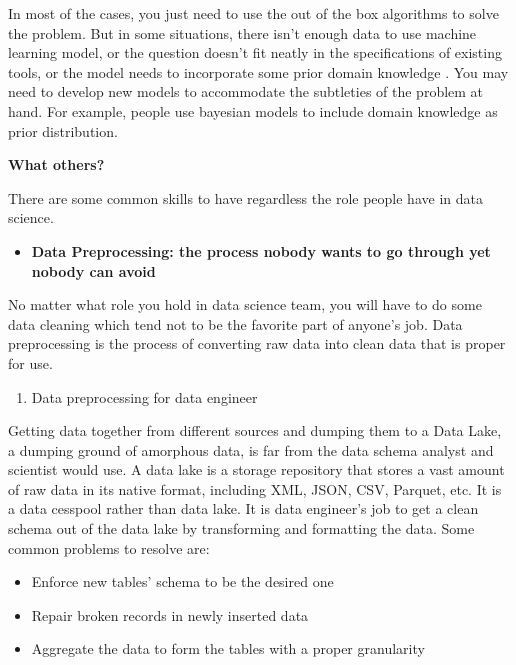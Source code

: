 \documentclass[12pt,]{krantz}
\providecommand{\tightlist}{%
  \setlength{\itemsep}{0pt}\setlength{\parskip}{0pt}}
\begin{document}
In most of the cases, you just need to use the out of the box algorithms to solve the problem. But in some situations, there isn't enough data to use machine learning model, or the question doesn't fit neatly in the specifications of existing tools, or the model needs to incorporate some prior domain knowledge . You may need to develop new models to accommodate the subtleties of the problem at hand. For example, people use bayesian models to include domain knowledge as prior distribution.

\textbf{What others?}

There are some common skills to have regardless the role people have in data science.

\begin{itemize}
\tightlist
\item
  \textbf{Data Preprocessing: the process nobody wants to go through yet nobody can avoid}
\end{itemize}

No matter what role you hold in data science team, you will have to do some data cleaning which tend not to be the favorite part of anyone's job. Data preprocessing is the process of converting raw data into clean data that is proper for use.

\begin{enumerate}
\def\labelenumi{(\arabic{enumi})}
\tightlist
\item
  Data preprocessing for data engineer
\end{enumerate}

Getting data together from different sources and dumping them to a Data Lake, a dumping ground of amorphous data, is far from the data schema analyst and scientist would use. A data lake is a storage repository that stores a vast amount of raw data in its native format, including XML, JSON, CSV, Parquet, etc. It is a data cesspool rather than data lake. It is data engineer's job to get a clean schema out of the data lake by transforming and formatting the data. Some common problems to resolve are:

\begin{itemize}
\tightlist
\item
  Enforce new tables' schema to be the desired one
\item
  Repair broken records in newly inserted data
\item
  Aggregate the data to form the tables with a proper granularity
\end{itemize}
\end{document}
